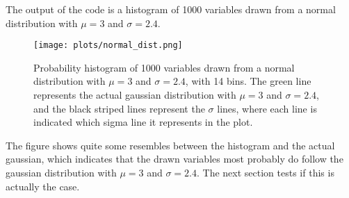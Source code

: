 The output of the code is a histogram of 1000 variables drawn from a normal distribution with $\mu = 3$ and $\sigma = 2.4$.
\begin{figure}[h]
\centering
\texttt{[image: plots/normal\_dist.png]}
\vspace{-1.5em}
\caption{Probability histogram of 1000 variables drawn from a normal distribution with $\mu = 3$ and $\sigma = 2.4$, with 14 bins. The green line represents the actual gaussian distribution with  $\mu = 3$ and $\sigma = 2.4$, and the black striped lines represent the $\sigma$ lines, where each line is indicated which sigma line it represents in the plot.}
\end{figure}

The figure shows quite some resembles between the histogram and the actual gaussian, which indicates that the drawn variables most probably do follow the gaussian distribution with $\mu = 3$ and $\sigma = 2.4$. The next section tests if this is actually the case.
\newpage
